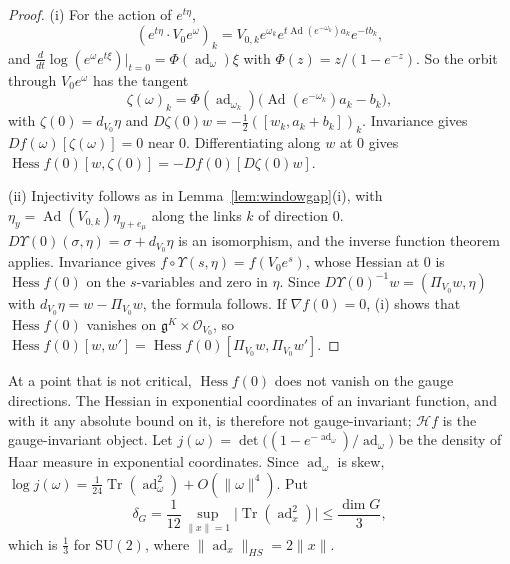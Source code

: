 \documentclass[11pt]{amsart}
\theoremstyle{definition}
\theoremstyle{remark}
\numberwithin{equation}{section}
\newcommand{\SU}{\mathrm{SU}}
\newcommand{\g}{\mathfrak{g}}
\newcommand{\Tr}{\operatorname{Tr}}
\newcommand{\Hess}{\operatorname{Hess}}
\begin{document}
\begin{proof}
(i) For the action of $e^{t\eta}$,
\[
(e^{t\eta}\cdot V_0e^\omega)_k=V_{0,k}e^{\omega_k}e^{t\operatorname{Ad}(
e^{-\omega_k})a_k}e^{-tb_k},
\]
and $\frac d{dt}\log(e^\omega e^{t\xi})|_{t=0}=\Phi(\operatorname{ad}_
\omega)\xi$ with $\Phi(z)=z/(1-e^{-z})$. So the orbit through $V_0e^\omega$
has the tangent
\[
\zeta(\omega)_k=\Phi(\operatorname{ad}_{\omega_k})\bigl(\operatorname{Ad}
(e^{-\omega_k})a_k-b_k\bigr),
\]
with $\zeta(0)=d_{V_0}\eta$ and $D\zeta(0)w=-\frac12([w_k,a_k+b_k])_k$. Invariance gives $Df(\omega)
[\zeta(\omega)]=0$ near $0$. Differentiating along $w$ at $0$ gives $\Hess
f(0)[w,\zeta(0)]=-Df(0)[D\zeta(0)w]$.

(ii) Injectivity follows as in Lemma~\ref{lem:windowgap}(i), with $\eta_y=
\operatorname{Ad}(V_{0,k})\eta_{y+e_\mu}$ along the links $k$ of direction
$0$. $D\Upsilon(0)(\sigma,\eta)=\sigma+d_{V_0}\eta$ is an isomorphism, and
the inverse function theorem applies. Invariance gives $f\circ\Upsilon(s,
\eta)=f(V_0e^s)$, whose Hessian at $0$ is $\Hess f(0)$ on the $s$-variables
and zero in $\eta$. Since $D\Upsilon(0)^{-1}w=(\Pi_{V_0}w,\eta)$ with
$d_{V_0}\eta=w-\Pi_{V_0}w$, the formula follows. If $\nabla f(0)=0$, (i)
shows that $\Hess f(0)$ vanishes on $\g^K\times\mathcal O_{V_0}$, so
$\Hess f(0)[w,w']=\Hess f(0)[\Pi_{V_0}w,\Pi_{V_0}w']$.
\end{proof}

At a point that is not critical, $\Hess f(0)$ does not vanish on the gauge
directions. The Hessian in exponential coordinates of an invariant
function, and with it any absolute bound on it, is therefore not
gauge-invariant; $\mathcal Hf$ is the gauge-invariant object. Let $j(\omega)=
\det\bigl((1-e^{-\operatorname{ad}_\omega})/\operatorname{ad}_\omega\bigr)$
be the density of Haar measure in exponential coordinates. Since $\operatorname
{ad}_\omega$ is skew, $\log j(\omega)=\frac1{24}\Tr(\operatorname{ad}_\omega
^2)+O(\lVert\omega\rVert^4)$. Put
\[
\delta_G=\frac1{12}\sup_{\lVert x\rVert=1}\lvert\Tr(\operatorname{ad}_x^2)
\rvert\le\frac{\dim G}3,
\]
which is $\frac13$ for $\SU(2)$, where $\lVert\operatorname{ad}_x\rVert_{HS}
=2\lVert x\rVert$.
\end{document}
